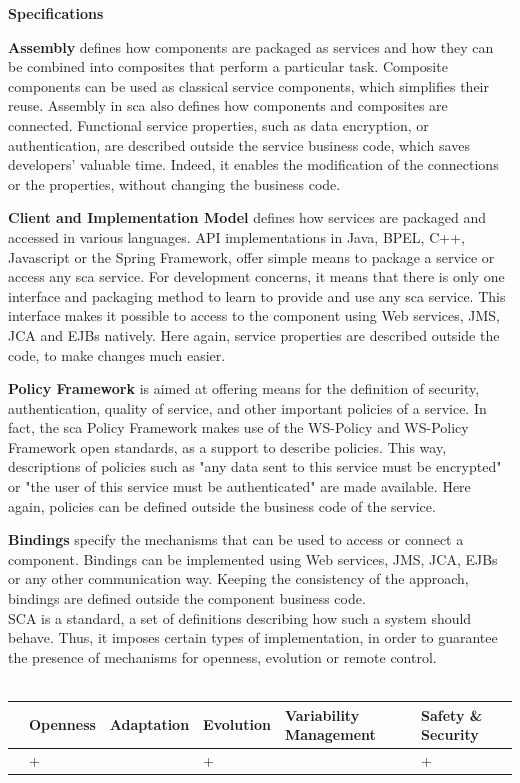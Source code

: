 {\bf Specifications}\\
\par {\bf Assembly} defines how components are packaged as services and how they can be combined into composites that perform a particular task.
Composite components can be used as classical service components, which simplifies their reuse. Assembly in \gls{sca} also defines how components and composites are connected. Functional service properties, such as data encryption, or authentication, are described outside the service business code, which saves developers' valuable time. Indeed, it enables the modification of the connections or the properties, without changing the business code.
\par {\bf Client and Implementation Model} defines how services are packaged and accessed in various languages. API implementations in Java, BPEL, C++, Javascript or the Spring Framework, offer simple means to package a service or access any \gls{sca} service. For development concerns, it means that there is only one interface and packaging method to learn to provide and use any \gls{sca} service. This interface makes it possible to access to the component using Web services, JMS, JCA and EJBs natively. Here again, service properties are described outside the code, to make changes much easier.
\par {\bf Policy Framework} is aimed at offering means for the definition of security, authentication, quality of service, and other important policies of a service. In fact, the \gls{sca} Policy Framework makes use of the WS-Policy and WS-Policy Framework open standards, as a support to describe policies. This way, descriptions of policies such as "any data sent to this service must be encrypted" or "the user of this service must be authenticated" are made available. Here again, policies can be defined outside the business code of the service.
\par {\bf Bindings} specify the mechanisms that can be used to access or connect a component. Bindings can be implemented using Web services, JMS, JCA, EJBs or any other communication way. Keeping the consistency of the approach, bindings are defined outside the component business code.\\

SCA is a standard, a set of definitions describing how such a system should behave. Thus, it imposes certain types of implementation, in order to guarantee the presence of mechanisms for openness, evolution or remote control.\\
\\
\begin{tabular}{ >{\centering}m{}| >{\centering}m{} >{\centering}m{}| >{\centering}m{} >{\centering}m{}| >{\centering\arraybackslash}m{}}
{\tiny Interoperability} & {\tiny Openness} & {\tiny Adaptation} & {\tiny Evolution} & {\tiny Variability Management} & {\tiny Safety \& Security}\\
 \hline
  & + &  & + &  & + \\ 
  \hline
\end{tabular}\\


